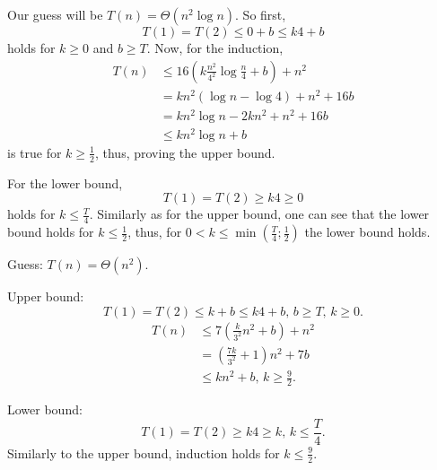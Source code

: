\documentclass[a4paper]{report}
\begin{document}
Our guess will be $T\left( n \right) = \Theta\left( n^2 \log n \right) $. So first, \[
T\left( 1 \right) = T\left( 2 \right) \le 0 + b \le k 4 + b
\] holds for $k\ge 0$ and $b\ge T$. Now, for the induction,
\begin{align*}
    T\left( n \right) &\le 16\left( k \frac{n^2}{4^2}\log \frac{n}{4} + b\right) + n^2 \\
    &= k n^2 \left( \log n - \log 4\right) + n^2 +16b\\
    &= kn^2 \log n -2kn^2 + n^2 + 16b \\
    &\le kn^2 \log n + b
\end{align*}
is true for $k\ge \frac{1}{2}$, thus, proving the upper bound.

For the lower bound, \[
T\left( 1 \right) = T\left( 2 \right) \ge k 4 \ge 0
\] holds for $k\le \frac{T}{4}$. Similarly as for the upper bound, one can see that the lower bound holds for $k \le \frac{1}{2}$, thus, for $0<k\le \min\left( \frac{T}{4};\frac{1}{2} \right) $ the lower bound holds.


Guess: $T\left( n \right) = \Theta\left( n^2 \right) $.

Upper bound:
\[
T\left( 1 \right) = T\left( 2 \right) \le k+b \le k 4 + b,\, b\ge T,\,k\ge 0
.\] 
\begin{align*}
    T\left( n \right)  &\le 7\left( \frac{k}{3^2}n^2 + b \right) + n^2 \\
    &= \left( \frac{7k}{3^2}+ 1 \right) n^2 + 7b \\
    &\le kn^2 + b,\, k \ge \frac{9}{2}
.\end{align*}

Lower bound:
\[
T\left( 1 \right) = T\left( 2 \right) \ge k 4 \ge k,\, k\le \frac{T}{4}
.\] 
Similarly to the upper bound, induction holds for $k \le \frac{9}{2}$.

\end{document}
